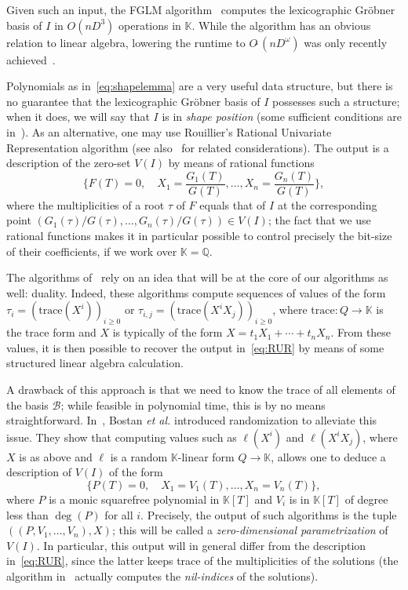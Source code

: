 \documentclass[12pt]{article}
\newcommand{\basis}{\mathscr{B}}
\newcommand{\trace}{\mathrm{trace}}
\def\Q {\ensuremath{\mathbb{Q}}}
\def\K{\mathbb{K}}
\def\K {\ensuremath{\mathbb{K}}}
\begin{document}
Given such an input, the FGLM algorithm~\cite{FaGiLaMo93} computes the
lexicographic Gr\"obner basis of $I$ in $O(nD^3)$ operations in $\K$.
While the algorithm has an obvious relation to linear algebra,
lowering the runtime to $O\tilde{~}(nD^\omega)$ was only recently
achieved~\cite{FaGaHuRe13,FaGaHuRe14,Neiger16}. 

Polynomials as in~\eqref{eq:shapelemma} are a very useful data
structure, but there is no guarantee that the lexicographic Gr\"obner
basis of $I$ possesses such a structure; when it does, we will say
that $I$ is in {\em shape position} (some sufficient conditions are
in~\cite{BeMoMaTr94}). As an alternative, one may use Rouillier's
Rational Univariate Representation algorithm \cite{Rouillier99} (see
also~\cite{AlBeRoWo94,BeWo96} for related considerations). The output
is a description of the zero-set $V(I)$ by means of rational functions
\begin{equation}\label{eq:RUR}
 \{  F(T)=0, \quad X_1 = \frac{G_1(T)}{G(T)}, \dots,X_n = \frac{G_n(T)}{G(T)} \},
\end{equation}
where the multiplicities of a root $\tau$ of $F$ equals that of
$I$ at the corresponding point
$(G_1(\tau)/G(\tau),\dots,G_n(\tau)/G(\tau)) \in V(I)$; the fact that
we use rational functions makes it in particular possible to control
precisely the bit-size of their coefficients, if we work over $\K=\Q$.

The algorithms of~\cite{AlBeRoWo94, BeWo96, Rouillier99} rely on an
idea that will be at the core of our algorithms as well: duality.
Indeed, these algorithms compute sequences of values of the form
$\tau_i=(\trace(X^i))_{i \ge 0}$ or 
$\tau_{i,j}=(\trace(X^i X_j))_{i \ge 0}$, where $\trace: Q \to \K$ is the trace 
form and $X$ is typically of the form $X=t_1 X_1 + \cdots + t_n X_n$.
From these values, it is then possible to recover the output
in~\eqref{eq:RUR} by means of some structured linear algebra calculation.

A drawback of this approach is that we need to know the trace of all
elements of the basis $\basis$; while feasible in polynomial time,
this is by no means straightforward. In~\cite{BoSaSc03}, Bostan {\it
  et al.} introduced randomization to alleviate this issue. They show
that computing values such as $\ell(X^i)$ and $\ell(X^i X_j)$, where
$X$ is as above and 
$\ell$ is a random $\K$-linear form $Q \to \K$, allows one to deduce
a description of $V(I)$ of the form
\begin{equation}\label{eq:BoSaSc03}
 \{  P(T)=0, \quad X_1 = V_1(T), \dots,X_n = V_n(T) \},
\end{equation}
where $P$ is a monic squarefree polynomial in $\K[T]$ and $V_i$ is in
$\K[T]$ of degree less than $\deg(P)$ for all $i$. Precisely, the
output of such algorithms is the tuple $((P,V_1,\dots,V_n),X)$; this
will be called a {\em zero-dimensional parametrization} of $V(I)$. In
particular, this output will in general differ from the description
in~\eqref{eq:RUR}, since the latter keeps trace of the multiplicities
of the solutions (the algorithm in~\cite{BoSaSc03} actually computes
the {\em nil-indices} of the solutions).
\end{document}
